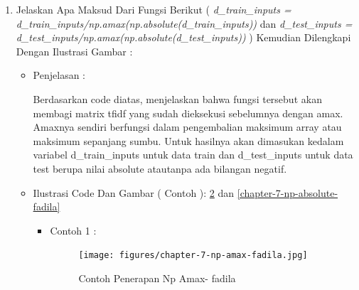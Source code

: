 \begin{enumerate}
\begin{itemize}
\par
\par
\item Ilustrasi Code Dan Gambar	( Contoh ): \ref{chapter-7-tokenizer-text-matrix-fadila}

\par
\par
\begin{figure}[!hbtp]
\centering
\texttt{[image: figures/chapter-7-tokenizer-text-matrix-fadila.jpg]}
\caption{Tokenizer Text To Matrix- fadila}
\label{chapter-7-tokenizer-text-matrix-fadila}
\end{figure}
\par
\par
\end{itemize}
\par
\par
\par
\item Jelaskan Apa Maksud Dari Fungsi Berikut ( \emph{d\_train\_inputs = d\_train\_inputs/np.amax(np.absolute(d\_train\_inputs))} dan \emph{d\_test\_inputs = d\_test\_inputs/np.amax(np.absolute(d\_test\_inputs))} ) Kemudian Dilengkapi Dengan Ilustrasi Gambar :
\begin{itemize}
\item Penjelasan : 
\par Berdasarkan code diatas, menjelaskan bahwa fungsi tersebut akan membagi matrix tfidf yang sudah dieksekusi sebelumnya dengan amax. Amaxnya sendiri berfungsi dalam pengembalian maksimum array atau maksimum sepanjang sumbu. Untuk hasilnya akan dimasukan kedalam variabel d\_train\_inputs untuk data train dan d\_test\_inputs untuk data test berupa nilai absolute atautanpa ada bilangan negatif.
\par
\par
\item Ilustrasi Code Dan Gambar	( Contoh ): \ref{chapter-7-np-amax-fadila} dan \ref{chapter-7-np-absolute-fadila}
\begin{itemize}
\item Contoh 1 :

\par
\par
\par
\begin{figure}[!hbtp]
\centering
\texttt{[image: figures/chapter-7-np-amax-fadila.jpg]}
\caption{Contoh Penerapan Np Amax- fadila}
\label{chapter-7-np-amax-fadila}
\end{figure}

\end{itemize}
\end{itemize}
\end{enumerate}
